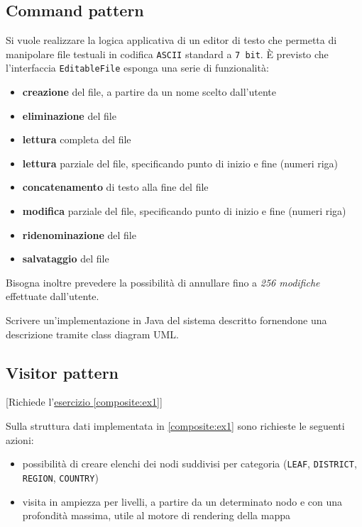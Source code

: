 \documentclass[12pt,a4paper]{article}
\begin{document}
    \subsection{Command pattern}
    \begin{Exercise}
        Si vuole realizzare la logica applicativa di un editor di testo che permetta di manipolare file testuali in codifica \texttt{ASCII} standard a \texttt{7 bit}. È previsto che l'interfaccia \texttt{EditableFile} esponga una serie di funzionalità:
        \begin{itemize}
            \item \textbf{creazione} del file, a partire da un nome scelto dall'utente
            \item \textbf{eliminazione} del file
            \item \textbf{lettura} completa del file
            \item \textbf{lettura} parziale del file, specificando punto di inizio e fine (numeri riga)
            \item \textbf{concatenamento} di testo alla fine del file
            \item \textbf{modifica} parziale del file, specificando punto di inizio e fine (numeri riga)
            \item \textbf{ridenominazione} del file
            \item \textbf{salvataggio} del file
        \end{itemize}
        Bisogna inoltre prevedere la possibilità di annullare fino a \textit{256 modifiche} effettuate dall'utente.

        Scrivere un'implementazione in Java del sistema descritto fornendone una descrizione tramite class diagram UML.
    \end{Exercise}


    \subsection{Visitor pattern}\label{pattern:visitors}
    \begin{Exercise}
    
    [Richiede l'\hyperref[composite:ex1]{esercizio \ref{composite:ex1}}]
    
    Sulla struttura dati implementata in \hyperref[composite:ex1]{\ref{composite:ex1}} sono richieste le seguenti azioni:
    \begin{itemize}
        \item possibilità di creare elenchi dei nodi suddivisi per categoria (\texttt{LEAF}, \texttt{DISTRICT}, \texttt{REGION}, \texttt{COUNTRY})
        \item visita in ampiezza per livelli, a partire da un determinato nodo e con una profondità massima, utile al motore di rendering della mappa
    \end{itemize}
    \end{Exercise}
	
\end{document}
